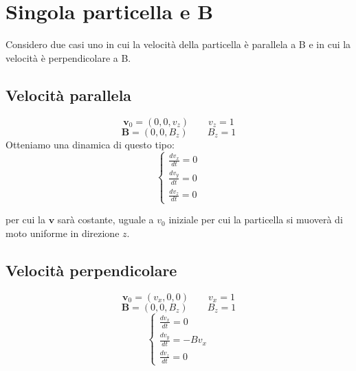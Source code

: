 \documentclass[11pt]{article}
\begin{document}
\section{Singola particella e B}
Considero due casi uno in cui la velocit\`a della particella è parallela a B e in cui la velocit\`a è perpendicolare a B.


\subsection{Velocit\`a parallela}
\begin{equation}\mathbf{v}_0=(0,0,v_z) \qquad v_z=1\end{equation}
\begin{equation}\mathbf{B}=(0,0,B_z) \qquad B_z=1\end{equation}
Otteniamo una dinamica di questo tipo:
\begin{equation}
\begin{cases} 
\frac{dv_x}{dt}= 0 \\ 
\frac{dv_y}{dt}= 0   \\ 
\frac{dv_z}{dt}= 0 
\end{cases}
\end{equation}

per cui la $\mathbf{v}$ sar\`a costante, uguale a $v_0$ iniziale per cui la particella si muover\`a di moto uniforme in direzione $z$.

\subsection{Velocit\`a perpendicolare}
\begin{equation}\mathbf{v}_0=(v_x,0,0) \qquad v_x=1 \end{equation}
\begin{equation}\mathbf{B}=(0,0,B_z) \qquad B_z=1\end{equation}
\begin{equation}
\begin{cases} 
\frac{dv_x}{dt}= 0  \\ 
\frac{dv_y}{dt}= - Bv_x\\ 
\frac{dv_z}{dt}=0 
\end{cases}
\end{equation}
\end{document}
